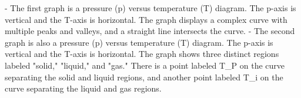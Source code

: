 - The first graph is a pressure (p) versus temperature (T) diagram. The p-axis is vertical and the T-axis is horizontal. The graph displays a complex curve with multiple peaks and valleys, and a straight line intersects the curve.
- The second graph is also a pressure (p) versus temperature (T) diagram. The p-axis is vertical and the T-axis is horizontal. The graph shows three distinct regions labeled "solid," "liquid," and "gas." There is a point labeled T_P on the curve separating the solid and liquid regions, and another point labeled T_i on the curve separating the liquid and gas regions.